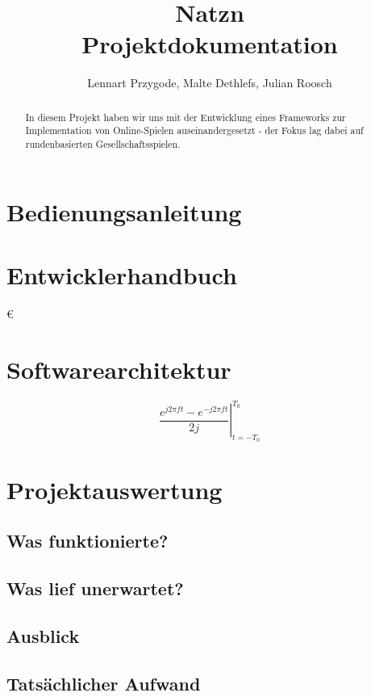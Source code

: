 \documentclass[paper=a4,12pt]{scrreprt}
\title{Natzn\\Projektdokumentation}
\author{Lennart Przygode, Malte Dethlefs, Julian Roosch}
\begin{document}
\maketitle
\tableofcontents
\begin{abstract}
In diesem Projekt haben wir uns mit der Entwicklung eines Frameworks zur Implementation von Online-Spielen auseinandergesetzt - der Fokus lag dabei auf rundenbasierten Gesellschaftsspielen.
\end{abstract}

\section{Bedienungsanleitung}
\section{Entwicklerhandbuch}
\euro 
\section{Softwarearchitektur}
\begin{displaymath}
\left.\frac{e^{j2\pi ft}-e^{-j2\pi ft}}{2j}\right|_{t=-T_0}^{T_0}
\end{displaymath}
\section{Projektauswertung}
\subsection{Was funktionierte?}
\subsection{Was lief unerwartet?}
\subsection{Ausblick}
\subsection{Tatsächlicher Aufwand}
\end{document}
